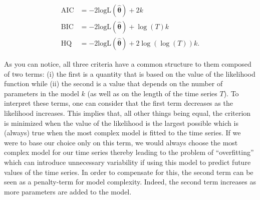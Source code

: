 \documentclass[]{book}
\theoremstyle{definition}
\theoremstyle{definition}
\theoremstyle{definition}
\theoremstyle{remark}
\begin{document}
\begin{align*}
  \text{AIC} &=  -2 \text{logL}(\hat{\boldsymbol{\theta}}) + 2k\\
  \text{BIC} &=  -2 \text{logL}(\hat{\boldsymbol{\theta}}) + \log(T) k\\
  \text{HQ}  &=  -2 \text{logL}(\hat{\boldsymbol{\theta}}) + 2\log(\log(T)) k .
\end{align*}

As you can notice, all three criteria have a common structure to them
composed of two terms: (i) the first is a quantity that is based on the
value of the likelihood function while (ii) the second is a value that
depends on the number of parameters in the model \(k\) (as well as on
the length of the time series \(T\)). To interpret these terms, one can
consider that the first term decreases as the likelihood increases. This
implies that, all other things being equal, the criterion is minimized
when the value of the likelihood is the largest possible which is
(always) true when the most complex model is fitted to the time series.
If we were to base our choice only on this term, we would always choose
the most complex model for our time series thereby leading to the
problem of ``overfitting'' which can introduce unnecessary variability
if using this model to predict future values of the time series. In
order to compensate for this, the second term can be seen as a
penalty-term for model complexity. Indeed, the second term increases as
more parameters are added to the model.
\end{document}
